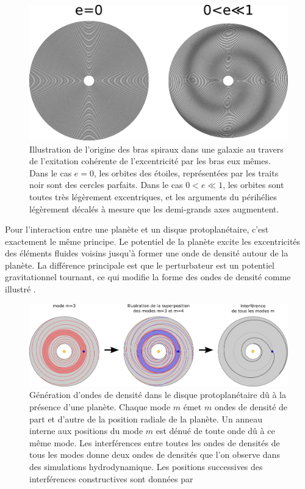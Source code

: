 \begin{figure}[htbp]
\centering
\includegraphics[width=0.9\linewidth]{figure/spiral_arms.pdf}
\caption{Illustration de l'origine des bras spiraux dans une galaxie au travers de l'exitation cohérente de l'excentricité par les bras eux mêmes. Dans le cas \og $e=0$\fg, les orbites des étoiles, représentées par les traits noir sont des cercles parfaits. Dans le cas \og $0<e\ll 1$\fg, les orbites sont toutes très légèrement excentriques, et les arguments du périhélies légèrement décalés à mesure que les demi-grands axes augmentent.}\label{fig:spiral_arms}
\end{figure}

\bigskip

Pour l'interaction entre une planète et un disque protoplanétaire, c'est exactement le même principe. Le potentiel de la planète excite les excentricités des éléments fluides voisins jusqu'à former une onde de densité autour de la planète. La différence principale est que le perturbateur est un potentiel gravitationnel tournant, ce qui modifie la forme des ondes de densité comme illustré . 

\begin{figure}[htbp]
\centering
\includegraphics[width=\linewidth]{figure/lindblad_torque.pdf}
\caption{Génération d'ondes de densité dans le disque protoplanétaire dû à la présence d'une planète. Chaque mode $m$ émet $m$ ondes de densité de part et d'autre de la position radiale de la planète. Un anneau interne  aux positions du mode $m$ est dénué de toute onde dû à ce même mode. Les interférences entre toutes les ondes de densités de tous les modes donne deux ondes de densités que l'on observe dans des simulations hydrodynamique. Les positions successives des interférences constructives sont données par \cite[eq. (13) et (24)]{ogilvie2002wake}}\label{fig:lindblad_torque}
\end{figure}


